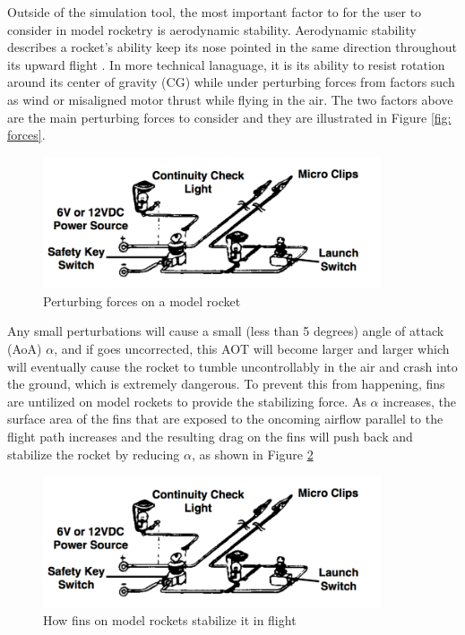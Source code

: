 \documentclass{workreport}
\begin{document}
\begin{body}
	Outside of the simulation tool, the most important factor to for the user to consider in model rocketry is aerodynamic stability. Aerodynamic stability describes a rocket's ability keep its nose pointed in the same direction throughout its upward flight \cite{estes_rocket_tech}. In more technical lanaguage, it is its ability to resist rotation around its center of gravity (CG) while under perturbing forces from factors such as wind or misaligned motor thrust while flying in the air. The two factors above are the main perturbing forces to consider and they are illustrated in Figure \ref{fig: forces}.

	\begin{figure}[!ht]
		\centering
		\includegraphics[width=10cm]{./images/forces.png}
		\caption{Perturbing forces on a model rocket}
		\label{fig:forces}
	\end{figure}

	Any small perturbations will cause a small (less than 5 degrees) angle of attack (AoA) $\alpha$, and if goes uncorrected, this AOT will become larger and larger which will eventually cause the rocket to tumble uncontrollably in the air and crash into the ground, which is extremely dangerous. To prevent this from happening, fins are untilized on model rockets to provide the stabilizing force. As $\alpha$ increases, the surface area of the fins that are exposed to the oncoming airflow parallel to the flight path increases and the resulting drag on the fins will push back and stabilize the rocket by reducing $\alpha$, as shown in Figure \ref{fig:fin_stable}

	\begin{figure}[!ht]
		\centering
		\includegraphics[width=10cm]{./images/fin_stable.png}
		\caption{How fins on model rockets stabilize it in flight}
		\label{fig:fin_stable}
	\end{figure}


\end{body}
\end{document}
